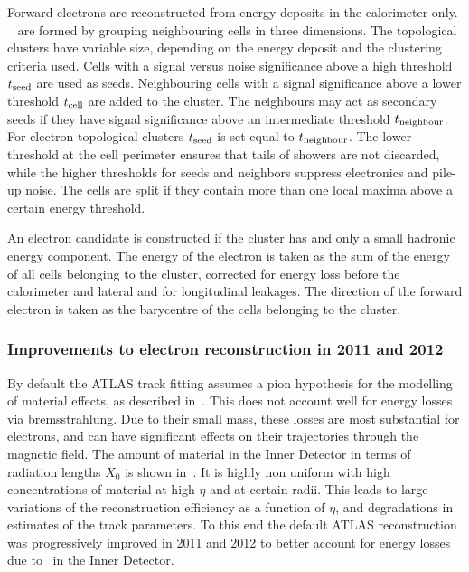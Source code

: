 Forward electrons are reconstructed from energy deposits in the calorimeter
only. ~\cite{Lampl:1099735} are formed by grouping neighbouring cells in three
dimensions. The topological clusters have variable size, depending
on the energy deposit and the clustering criteria used. Cells with a
signal versus noise significance above a high threshold $t_{\rm{seed}}$ are used as seeds.
Neighbouring cells with a signal significance above a lower threshold
$t_{\rm{cell}}$ are added to the cluster. The neighbours may act as
secondary seeds if they have signal significance above an intermediate threshold
$t_{\rm{neighbour}}$. For electron topological clusters $t_{\rm{seed}}$ is set
equal to $t_{\rm{neighbour}}$. The lower threshold at the cell perimeter ensures that
tails of showers are not discarded, while the higher thresholds for seeds and
neighbors suppress electronics and pile-up noise. The cells are split if they
contain more than one local maxima above a certain energy threshold. 

An electron candidate is constructed if the cluster has  and only a
small hadronic energy component. The energy
of the electron is taken as the sum of the energy of all cells belonging to the cluster,
corrected for energy loss before the calorimeter and lateral and for longitudinal
leakages. The direction of the forward electron is taken as the barycentre of the cells
belonging to the cluster.

\subsubsection{Improvements to electron reconstruction in 2011 and 2012}

By default the ATLAS track fitting assumes a pion hypothesis for the modelling
of material effects, as described in~. This does not account well for energy losses via
bremsstrahlung. Due to their small mass, these losses are most substantial for
electrons, and can have significant effects on their trajectories through the magnetic
field. The amount of material in the Inner Detector in terms of radiation lengths
$X_{0}$ is shown in~. It is highly non uniform with high
concentrations of material at high $\eta$ and at certain radii.
This leads to large variations of the reconstruction efficiency as a function of
$\eta$, and degradations in estimates of the track parameters. To this end the
default ATLAS reconstruction was progressively improved in 2011 and 2012 to
better account for energy losses due to \brem\ in the Inner Detector.

